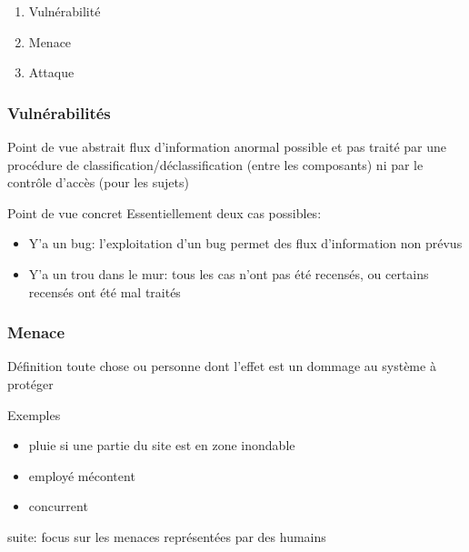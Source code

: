 \begin{reveals}
\begin{frame}
  \vfill
  \begin{enumerate}
  \item Vulnérabilité
  \item Menace
  \item Attaque
  \end{enumerate}
  \vfill
\end{frame}


\begin{frame}
  \frametitle{Vulnérabilités}

  \vfill
  
  \begin{block}{Point de vue abstrait}
    flux d'information anormal possible et pas traité par une
    procédure de classification/déclassification (entre les
    composants) ni par le contrôle d'accès (pour les sujets)
  \end{block}

  \vfill

  \begin{block}{Point de vue concret}
    Essentiellement deux cas possibles:
    \begin{itemize}
    \pause\item Y'a un bug: l'exploitation d'un bug permet des flux
    d'information non prévus 
    \pause\item Y'a un trou dans le mur: tous les cas n'ont pas été
    recensés, ou certains recensés ont été mal traités
    \end{itemize}
  \end{block}

  \vfill
\end{frame}


\begin{frame}
  \frametitle{Menace}

  \vfill

  \begin{block}{Définition}
    toute chose ou personne dont l'effet est un dommage au système à protéger
  \end{block}

  \vfill

  \begin{block}{Exemples}
    \begin{itemize}
    \item pluie si une partie du site est en zone inondable
    \item employé mécontent
    \item concurrent
    \end{itemize}
    suite: focus sur les menaces représentées par des humains
  \end{block}
\end{frame}


\end{reveals}
